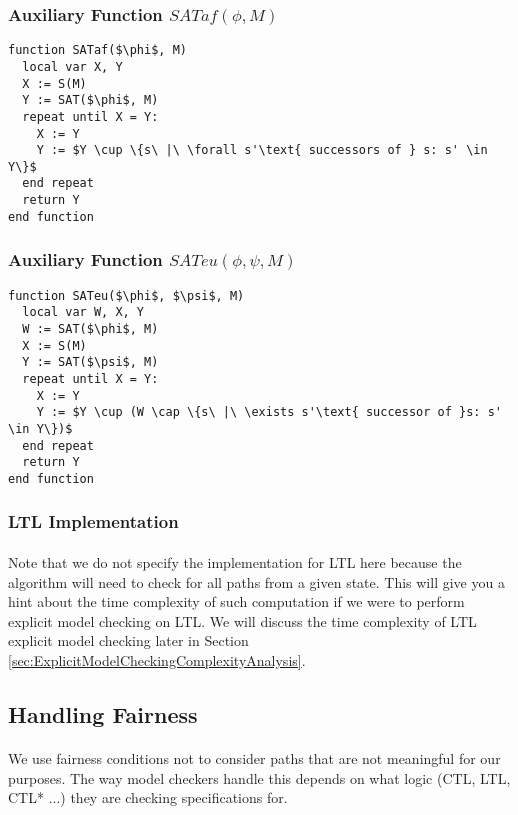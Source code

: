 \documentclass{article}
\theoremstyle{plain}
\theoremstyle{definition}
\begin{document}
\begin{multicols}{2}
\subsubsection{Auxiliary Function $SATaf(\phi, M)$}

\begin{lstlisting}[mathescape=true]
function SATaf($\phi$, M)
  local var X, Y
  X := S(M)
  Y := SAT($\phi$, M)
  repeat until X = Y:
    X := Y
    Y := $Y \cup \{s\ |\ \forall s'\text{ successors of } s: s' \in Y\}$
  end repeat
  return Y
end function
\end{lstlisting}

\subsubsection{Auxiliary Function $SATeu(\phi, \psi, M)$}

\begin{lstlisting}[mathescape=true]
function SATeu($\phi$, $\psi$, M)
  local var W, X, Y
  W := SAT($\phi$, M)
  X := S(M)
  Y := SAT($\psi$, M)
  repeat until X = Y:
    X := Y
    Y := $Y \cup (W \cap \{s\ |\ \exists s'\text{ successor of }s: s' \in Y\})$
  end repeat
  return Y
end function
\end{lstlisting}

\subsubsection{LTL Implementation}

\paragraph{} Note that we do not specify the implementation for LTL here because the algorithm will need to check for all paths from a given state. This will give you a hint about the time complexity of such computation if we were to perform explicit model checking on LTL. We will discuss the time complexity of LTL explicit model checking later in Section \ref{sec:ExplicitModelCheckingComplexityAnalysis}.

\subsection{Handling Fairness}
\paragraph{} We use fairness conditions not to consider paths that are not meaningful for our purposes. The way model checkers handle this depends on what logic (CTL, LTL, CTL* ...) they are checking specifications for.


\end{multicols}
\end{document}
